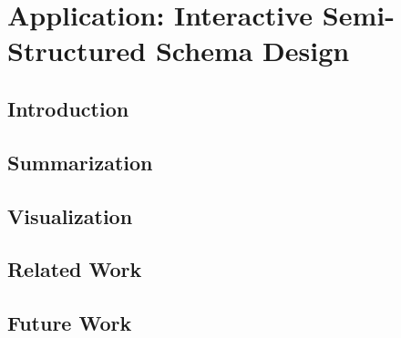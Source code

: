 \chapter{Application: Interactive Semi-Structured Schema Design}
\begin{abstract}

\end{abstract}

\section{Introduction}
\label{sec:introduction}


\section{Summarization}
\label{sec:distribution}


\section{Visualization}
\label{sec:visualization}


% 

% 

\section{Related Work}
\label{sec:related}


\section{Future Work}
\label{sec:future}

